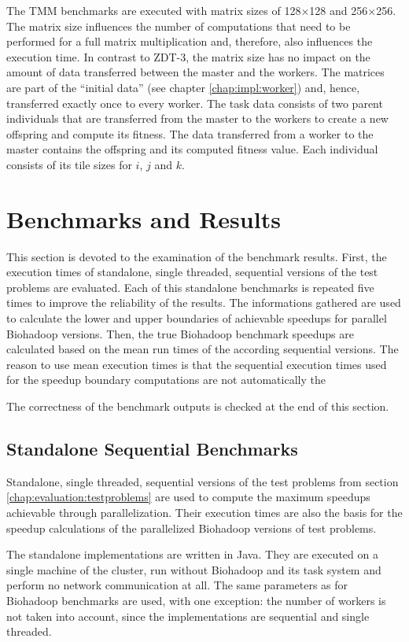 The TMM benchmarks are executed with matrix sizes of 128$\times$128 and 256$\times$256. The matrix size influences the number of computations that need to be performed for a full matrix multiplication and, therefore, also influences the execution time. In contrast to ZDT-3, the matrix size has no impact on the amount of data transferred between the master and the workers. The matrices are part of the ``initial data'' (see chapter \ref{chap:impl:worker}) and, hence, transferred exactly once to every worker. The task data consists of two parent individuals that are transferred from the master to the workers to create a new offspring and compute its fitness. The data transferred from a worker to the master contains the offspring and its computed fitness value. Each individual consists of its tile sizes for $i$, $j$ and $k$.

\section{Benchmarks and Results}
\label{chap:evaluation:benchmark-results}
This section is devoted to the examination of the benchmark results. First, the execution times of standalone, single threaded, sequential versions of the test problems are evaluated. Each of this standalone benchmarks is repeated five times to improve the reliability of the results. The informations gathered are used to calculate the lower and upper boundaries of achievable speedups for parallel Biohadoop versions. Then, the true Biohadoop benchmark speedups are calculated based on the mean run times of the according sequential versions. The reason to use mean execution times is that the sequential execution times used for the speedup boundary computations are not automatically the 

The correctness of the benchmark outputs is checked at the end of this section.

\subsection{Standalone Sequential Benchmarks}
Standalone, single threaded, sequential versions of the test problems from section \ref{chap:evaluation:testproblems} are used to compute the maximum speedups achievable through parallelization. Their execution times are also the basis for the speedup calculations of the parallelized Biohadoop versions of test problems.

The standalone implementations are written in Java. They are executed on a single machine of the cluster, run without Biohadoop and its task system and perform no network communication at all. The same parameters as for Biohadoop benchmarks are used, with one exception: the number of workers is not taken into account, since the implementations are sequential and single threaded.

